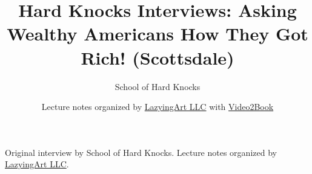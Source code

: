\documentclass[11pt,oneside]{book}
\begin{document}
\frontmatter
\title{Hard Knocks Interviews: Asking Wealthy Americans How They Got Rich! (Scottsdale)}
\author{School of Hard Knocks}
\date{Lecture notes organized by \href{https://lazying.art}{LazyingArt LLC} with \href{https://github.com/lachlanchen/Video2Book}{Video2Book}}
\maketitle
\begin{center}
\small Original interview by School of Hard Knocks. Lecture notes organized by \href{https://lazying.art}{LazyingArt LLC}.
\end{center}
\clearpage
\mainmatter

\end{document}
